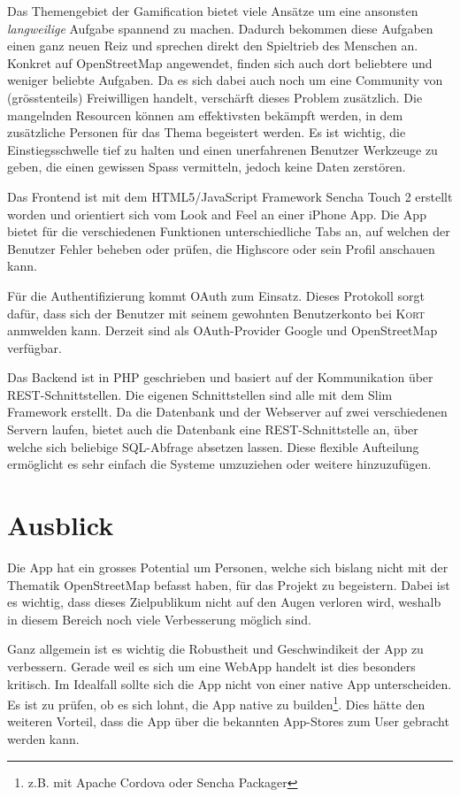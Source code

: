 Das Themengebiet der Gamification bietet viele Ansätze um eine ansonsten \emph{langweilige} Aufgabe spannend zu machen.
Dadurch bekommen diese Aufgaben einen ganz neuen Reiz und sprechen direkt den Spieltrieb des Menschen an.
Konkret auf OpenStreetMap angewendet, finden sich auch dort beliebtere und weniger beliebte Aufgaben.
Da es sich dabei auch noch um eine Community von (grösstenteils) Freiwilligen handelt, verschärft dieses Problem zusätzlich.
Die mangelnden Resourcen können am effektivsten bekämpft werden, in dem zusätzliche Personen für das Thema begeistert werden.
Es ist wichtig, die Einstiegsschwelle tief zu halten und einen unerfahrenen Benutzer Werkzeuge zu geben, die einen gewissen Spass vermitteln, jedoch keine Daten zerstören.

Das Frontend ist mit dem HTML5/JavaScript Framework Sencha Touch 2 erstellt worden und orientiert sich vom Look and Feel an einer iPhone App.
Die App bietet für die verschiedenen Funktionen unterschiedliche Tabs an, auf welchen der Benutzer Fehler beheben oder prüfen, die Highscore oder sein Profil anschauen kann.

Für die Authentifizierung kommt \gls{OAuth} zum Einsatz.
Dieses Protokoll sorgt dafür, dass sich der Benutzer mit seinem gewohnten Benutzerkonto bei \textsc{Kort} anmwelden kann.
Derzeit sind als OAuth-Provider Google und OpenStreetMap verfügbar.

Das Backend ist in PHP geschrieben und basiert auf der Kommunikation über \gls{REST}-Schnittstellen.
Die eigenen Schnittstellen sind alle mit dem Slim Framework erstellt.
Da die Datenbank und der Webserver auf zwei verschiedenen Servern laufen, bietet auch die Datenbank eine REST-Schnittstelle an, über welche sich beliebige SQL-Abfrage absetzen lassen.
Diese flexible Aufteilung ermöglicht es sehr einfach die Systeme umzuziehen oder weitere hinzuzufügen.


\section*{Ausblick}
Die App hat ein grosses Potential um Personen, welche sich bislang nicht mit der Thematik OpenStreetMap befasst haben, für das Projekt zu begeistern. 
Dabei ist es wichtig, dass dieses Zielpublikum nicht auf den Augen verloren wird, weshalb in diesem Bereich noch viele Verbesserung möglich sind.

Ganz allgemein ist es wichtig die Robustheit und Geschwindikeit der App zu verbessern. 
Gerade weil es sich um eine \gls{WebApp} handelt ist dies besonders kritisch. 
Im Idealfall sollte sich die App nicht von einer native App unterscheiden.
Es ist zu prüfen, ob es sich lohnt, die App native zu builden\footnote{z.B. mit Apache Cordova oder Sencha Packager}.
Dies hätte den weiteren Vorteil, dass die App über die bekannten \gls{App-Store}s zum User gebracht werden kann.

